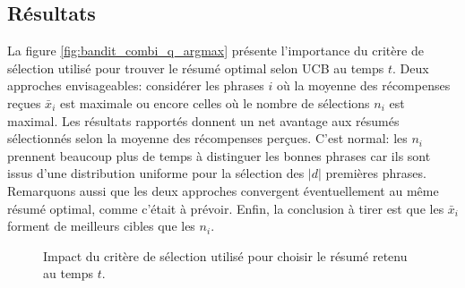 
\subsection{Résultats}
\label{subsec:ucb_resultats}

La figure \ref{fig:bandit_combi_q_argmax} présente l'importance du critère de sélection
utilisé pour trouver le résumé optimal selon UCB au temps $t$.
Deux approches envisageables: considérer les phrases $i$ où la moyenne des récompenses reçues
$\bar{x}_i$ est maximale ou encore celles où le nombre de sélections $n_i$ est maximal.
Les résultats rapportés donnent un net avantage aux résumés sélectionnés selon la moyenne des
récompenses perçues.
C'est normal: les $n_i$ prennent beaucoup plus de temps à distinguer les bonnes phrases
car ils sont issus d'une distribution uniforme pour la sélection des $|d|$ premières phrases.
Remarquons aussi que les deux approches convergent éventuellement au même résumé optimal,
comme c'était à prévoir.
Enfin, la conclusion à tirer est que les $\bar{x}_i$ forment de meilleurs cibles que les $n_i$.

\begin{figure}[h!]
    \begin{center}
    \end{center}
    \caption{Impact du critère de sélection utilisé pour choisir le résumé retenu au temps $t$.}
        
\end{figure}

